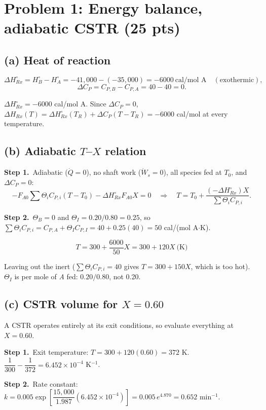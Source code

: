 \documentclass[11pt]{article}
\newcommand{\step}[1]{\par\smallskip\textbf{Step #1.}\ }
\begin{document}
\section*{Problem 1: Energy balance, adiabatic CSTR (25 pts)}

\subsection*{(a) Heat of reaction}
\[
\Delta H^\circ_{Rx}=H_B^\circ-H_A^\circ=-41{,}000-(-35{,}000)=-6000\ \text{cal/mol A}\quad(\text{exothermic}),
\]
\[
\Delta C_P=C_{P,B}-C_{P,A}=40-40=0 .
\]
\begin{answer}
$\Delta H^\circ_{Rx}=-6000$ cal/mol A. Since $\Delta C_P=0$, $\Delta H_{Rx}(T)=\Delta H^\circ_{Rx}(T_R)+\Delta C_P(T-T_R)=-6000$
cal/mol at every temperature.
\end{answer}

\subsection*{(b) Adiabatic $T$--$X$ relation}
\step{1}Adiabatic ($\dot Q=0$), no shaft work ($\dot W_s=0$), all species fed at $T_0$, and $\Delta C_P=0$:
\[
-F_{A0}\sum\Theta_iC_{P,i}(T-T_0)-\Delta H^\circ_{Rx}F_{A0}X=0
\quad\Rightarrow\quad
T=T_0+\frac{(-\Delta H^\circ_{Rx})X}{\sum\Theta_iC_{P,i}} .
\]
\step{2}$\Theta_B=0$ and $\Theta_I=0.20/0.80=0.25$, so
$\sum\Theta_iC_{P,i}=C_{P,A}+\Theta_IC_{P,I}=40+0.25(40)=50$ cal/(mol A$\cdot$K).
\begin{answer}
\[
T=300+\frac{6000}{50}X=300+120X\ \text{(K)}
\]
\end{answer}
\begin{mistake}
Leaving out the inert ($\sum\Theta_iC_{P,i}=40$ gives $T=300+150X$, which is too hot). $\Theta_I$ is per mole of \emph{A} fed:
$0.20/0.80$, not 0.20.
\end{mistake}

\subsection*{(c) CSTR volume for $X=0.60$}
A CSTR operates entirely at its exit conditions, so evaluate everything at $X=0.60$.

\step{1}Exit temperature: $T=300+120(0.60)=372$ K. \quad $\dfrac{1}{300}-\dfrac{1}{372}=6.452\times10^{-4}$ K$^{-1}$.

\step{2}Rate constant:
$k=0.005\exp\!\left[\dfrac{15{,}000}{1.987}(6.452\times10^{-4})\right]=0.005\,e^{4.870}=0.652$ min$^{-1}$.
\end{document}
